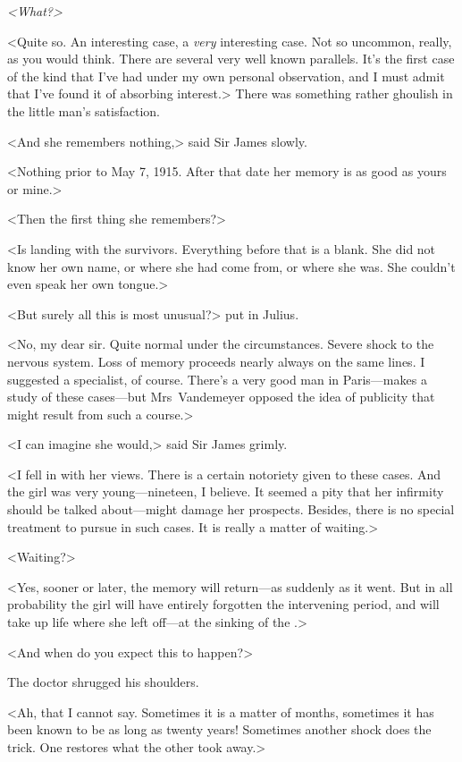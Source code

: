 \emph{<What?>}

<Quite so. An interesting case, a \emph{very} interesting case. Not so uncommon, really, as you would think. There are several very well known parallels. It's the first case of the kind that I've had under my own personal observation, and I must admit that I've found it of absorbing interest.> There was something rather ghoulish in the little man's satisfaction.

<And she remembers nothing,> said Sir James slowly.

<Nothing prior to May 7, 1915. After that date her memory is as good as yours or mine.>

<Then the first thing she remembers?>

<Is landing with the survivors. Everything before that is a blank. She did not know her own name, or where she had come from, or where she was. She couldn't even speak her own tongue.>

<But surely all this is most unusual?> put in Julius.

<No, my dear sir. Quite normal under the circumstances. Severe shock to the nervous system. Loss of memory proceeds nearly always on the same lines. I suggested a specialist, of course. There's a very good man in Paris—makes a study of these cases—but Mrs~Vandemeyer opposed the idea of publicity that might result from such a course.>

<I can imagine she would,> said Sir James grimly.

<I fell in with her views. There is a certain notoriety given to these cases. And the girl was very young—nineteen, I believe. It seemed a pity that her infirmity should be talked about—might damage her prospects. Besides, there is no special treatment to pursue in such cases. It is really a matter of waiting.>

<Waiting?>

<Yes, sooner or later, the memory will return—as suddenly as it went. But in all probability the girl will have entirely forgotten the intervening period, and will take up life where she left off—at the sinking of the .>

<And when do you expect this to happen?>

The doctor shrugged his shoulders.

<Ah, that I cannot say. Sometimes it is a matter of months, sometimes it has been known to be as long as twenty years! Sometimes another shock does the trick. One restores what the other took away.>

